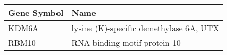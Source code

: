 \begin{tabular}{ll}
\toprule
Gene Symbol &                                    Name \\
\midrule
      KDM6A & lysine (K)-specific demethylase 6A, UTX \\
      RBM10 &            RNA binding motif protein 10 \\
\bottomrule
\end{tabular}
